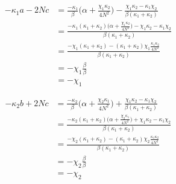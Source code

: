 \documentclass[11pt,a4paper]{article}
\numberwithin{equation}{section}
\begin{document}
\begin{appendices}
	\begin{align*}
	-\kappa_1 a - 2Nc &= \frac{-\kappa_1}{\beta} \Big(\alpha + \frac{\chi_1 \kappa_2}{4N^2} \Big) - \frac{\chi_1 \kappa_2 - \kappa_1 \chi_2}{\beta (\kappa_1+\kappa_2)}&\\
	&= \frac{-\kappa_1 (\kappa_1+\kappa_2) \Big(\alpha + \frac{\chi_1 \kappa_2}{4N^2} \Big) - \chi_1 \kappa_2 - \kappa_1 \chi_2}{\beta (\kappa_1+\kappa_2)}&\\
	&= \frac{-\chi_1(\kappa_1+\kappa_2)- (\kappa_1+\kappa_2)\chi_1 \frac{\kappa_1 \kappa_2}{4N^2}}{\beta (\kappa_1+\kappa_2)}&\\
	&= -\chi_1 \frac{\beta}{\beta}&\\
	&= -\chi_1&
	\end{align*}
	
	\begin{align*}
	-\kappa_2 b + 2Nc &= \frac{-\kappa_2}{\beta} \Big(\alpha + \frac{\chi_2 \kappa_1}{4N^2} \Big) + \frac{\chi_1 \kappa_2 - \kappa_1 \chi_2}{\beta (\kappa_1+\kappa_2)}&\\
	&= \frac{-\kappa_2 (\kappa_1+\kappa_2) \Big(\alpha + \frac{\chi_2 \kappa_1}{4N^2} \Big) + \chi_1 \kappa_2 - \kappa_1 \chi_2}{\beta (\kappa_1+\kappa_2)}&\\
	&= \frac{-\chi_2(\kappa_1+\kappa_2)- (\kappa_1+\kappa_2)\chi_2 \frac{\kappa_1 \kappa_2}{4N^2}}{\beta (\kappa_1+\kappa_2)}&\\
	&= -\chi_2 \frac{\beta}{\beta}&\\
	&= - \chi_2&
	\end{align*}

	
	\end{appendices}
	
	\newpage
	
	
	
	
\end{document}
